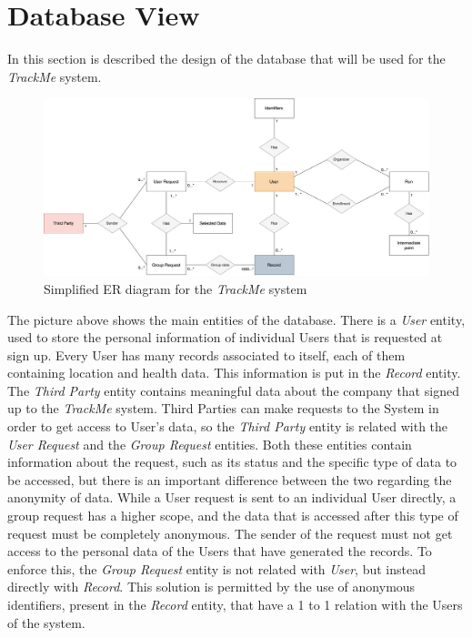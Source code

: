 \section{Database View}

In this section is described the design of the database that will be used for the \textit{TrackMe} system. 

\begin{figure}[H]
\includegraphics[scale=0.13,keepaspectratio]{./Pictures/ER-diagram.png}
\centering
\caption{Simplified ER diagram for the \textit{TrackMe} system}
\end{figure}

The picture above shows the main entities of the database. There is a \textit{User} entity, used to store the personal information of individual Users that is requested at sign up. Every User has many records associated to itself, each of them containing location and health data. This information is put in the \textit{Record} entity. The \textit{Third Party} entity contains meaningful data about the company that signed up to the \textit{TrackMe} system. Third Parties can make requests to the System in order to get access to User's data, so the \textit{Third Party} entity is related with the \textit{User Request} and the \textit{Group Request} entities. Both these entities contain information about the request, such as its status and the specific type of data to be accessed, but there is an important difference between the two regarding the anonymity of data. While a User request is sent to an individual User directly, a group request has a higher scope, and the data that is accessed after this type of request must be completely anonymous. The sender of the request must not get access to the personal data of the Users that have generated the records. To enforce this, the \textit{Group Request} entity is not related with \textit{User}, but instead directly with \textit{Record}. This solution is permitted by the use of anonymous identifiers, present in the \textit{Record} entity, that have a 1 to 1 relation with the Users of the system.

